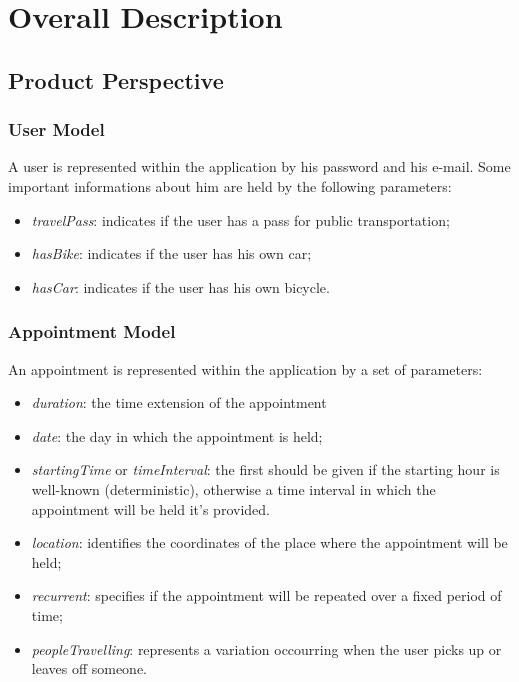 \chapter{Overall Description}

\section{Product Perspective}

\subsection{User Model} \label{subsect:usermodel}
A user is represented within the application by his password and his e-mail. 
Some important informations about him are held by the following parameters:
\begin{itemize}
\item \textit{travelPass}: indicates if the user has a pass for public transportation;
\item \textit{hasBike}: indicates if the user has his own car;
\item \textit{hasCar}: indicates if the user has his own bicycle.
\end{itemize}

\subsection{Appointment Model} \label{subsect:appointmentmodel}
An appointment is represented within the application by a set of parameters:
\begin{itemize}
\item \textit{duration}: the time extension of the appointment
\item \textit{date}: the day in which the appointment is held;
\item \textit{startingTime} or \textit{timeInterval}: the first should be given if the starting hour is well-known (deterministic), otherwise a time interval in which the appointment will be held it's provided. 
\item \textit{location}: identifies the coordinates of the place where the appointment will be held;
\item \textit{recurrent}: specifies if the appointment will be repeated over a fixed period of time;
\item \textit{peopleTravelling}: represents a variation occourring when the user picks up or leaves off someone.
\end{itemize}

